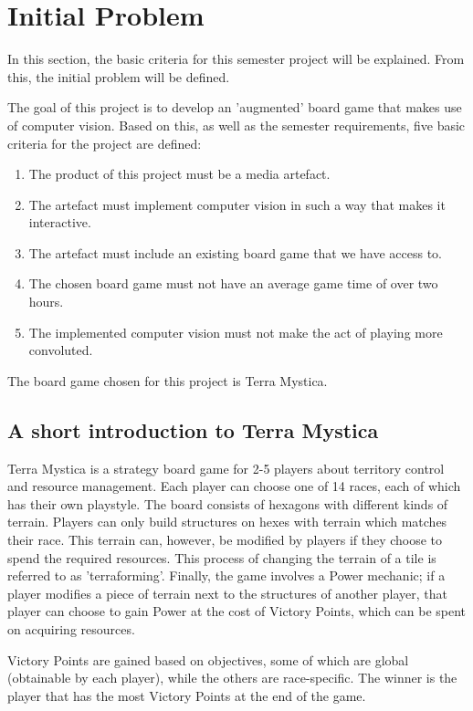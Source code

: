\chapter{Initial Problem}\label{ch:iniprob}
In this section, the basic criteria for this semester project will be explained. From this, the initial problem will be defined.

The goal of this project is to develop an 'augmented' board game that makes use of computer vision. Based on this, as well as the semester requirements, five basic criteria for the project are defined:

\begin{enumerate}
	\item The product of this project must be a media artefact.
	\item The artefact must implement computer vision in such a way that makes it interactive.
	\item The artefact must include an existing board game that we have access to.
	 \item The chosen board game must not have an average game time of over two hours.
	\item The implemented computer vision must not make the act of playing more convoluted.
\end{enumerate}

The board game chosen for this project is Terra Mystica.

\section{A short introduction to Terra Mystica} 
Terra Mystica is a strategy board game for 2-5 players about territory control and resource management. Each player can choose one of 14 races, each of which has their own playstyle. The board consists of hexagons with different kinds of terrain. Players can only build structures on hexes with terrain which matches their race. This terrain can, however, be modified by players if they choose to spend the required resources. This process of changing the terrain of a tile is referred to as 'terraforming'. Finally, the game involves a Power mechanic; if a player modifies a piece of terrain next to the structures of another player, that player can choose to gain Power at the cost of Victory Points, which can be spent on acquiring resources.  

Victory Points are gained based on objectives, some of which are global (obtainable by each player), while the others are race-specific. The winner is the player that has the most Victory Points at the end of the game.

